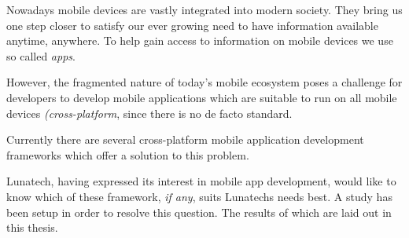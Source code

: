\samenvatting



Nowadays mobile devices are vastly integrated into modern society. They bring us one step closer to satisfy our ever growing need to have information available anytime, anywhere. To help gain access to information on mobile devices we use so called \emph{apps}. 

However, the fragmented nature of today's mobile ecosystem poses a challenge for developers to develop mobile applications which are suitable to run on all mobile devices \emph{(cross-platform}, since there is no de facto standard.

Currently there are several cross-platform mobile application development frameworks which offer a solution to this problem. 

Lunatech, having expressed its interest in mobile app development, would like to know which of these framework, \emph{if any}, suits Lunatechs needs best. A study has been setup in order to resolve this question. The results of which are laid out in this thesis.